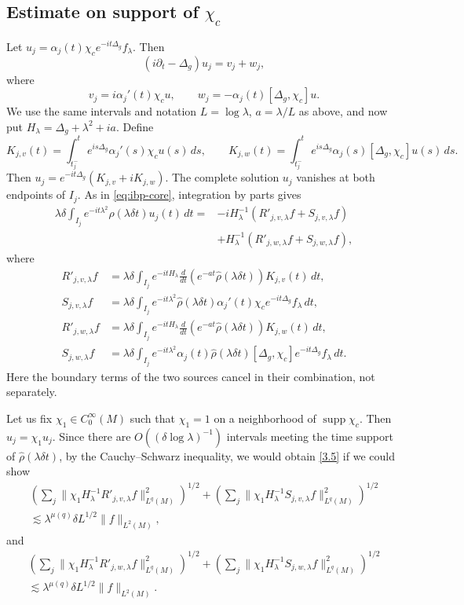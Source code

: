 \documentclass[11pt]{amsart}
\newcommand{\la}{\lambda}
\begin{document}
\subsection{Estimate on support of $\chi_c$}
Let $u_j=\alpha_j(t)\chi_ce^{-it\Delta_g}f_\la$. Then
\[
(i\partial_t-\Delta_g)u_j=v_j+w_j,
\]
where
\begin{equation}\label{eq:def-ujvj}
v_j=i\alpha_j'(t)\chi_cu,\qquad
w_j=-\alpha_j(t)[\Delta_g,\chi_c]u.
\end{equation}
We use the same intervals and notation $L=\log\la$, $a=\la/L$ as above, and now put $H_\la=\Delta_g+\la^2+ia$. Define
\[
K_{j,v}(t)=\int_{t_j^-}^t e^{is\Delta_g}\alpha_j'(s)\chi_cu(s)\,ds,
\qquad
K_{j,w}(t)=\int_{t_j^-}^t e^{is\Delta_g}\alpha_j(s)[\Delta_g,\chi_c]u(s)\,ds.
\]
Then $u_j=e^{-it\Delta_g}(K_{j,v}+iK_{j,w})$. The complete solution $u_j$ vanishes at both endpoints of $I_j$. As in \eqref{eq:ibp-core}, integration by parts gives
\begin{equation}\label{eq:ibp-exterior}
\begin{split}
\la\delta\int_{I_j}e^{-it\la^2}\widehat\rho(\la\delta t)u_j(t)\,dt
={}&-iH_\la^{-1}(R'_{j,v,\la}f+S_{j,v,\la}f)\\
&+H_\la^{-1}(R'_{j,w,\la}f+S_{j,w,\la}f),
\end{split}
\end{equation}
where
\begin{align*}
R'_{j,v,\la}f&=\la\delta\int_{I_j}e^{-itH_\la}
\frac{d}{dt}(e^{-at}\widehat\rho(\la\delta t))K_{j,v}(t)\,dt,\\
S_{j,v,\la}f&=\la\delta\int_{I_j}e^{-it\la^2}\widehat\rho(\la\delta t)
\alpha_j'(t)\chi_ce^{-it\Delta_g}f_\la\,dt,\\
R'_{j,w,\la}f&=\la\delta\int_{I_j}e^{-itH_\la}
\frac{d}{dt}(e^{-at}\widehat\rho(\la\delta t))K_{j,w}(t)\,dt,\\
S_{j,w,\la}f&=\la\delta\int_{I_j}e^{-it\la^2}\alpha_j(t)\widehat\rho(\la\delta t)
[\Delta_g,\chi_c]e^{-it\Delta_g}f_\la\,dt.
\end{align*}
Here the boundary terms of the two sources cancel in their combination, not separately.

Let us fix $\chi_1\in C_0^\infty(M)$ such that $\chi_1=1$ on a neighborhood of $\operatorname{supp}\chi_c$. Then $u_j=\chi_1u_j$. Since there are $O((\delta\log\la)^{-1})$ intervals meeting the time support of $\widehat\rho(\la\delta t)$, by the Cauchy--Schwarz inequality, we would obtain \eqref{3.5} if we could show
\begin{multline}\label{3.13}
\left(\sum_j\|\chi_1H_\la^{-1}R'_{j,v,\la}f\|_{L^q(M)}^2\right)^{1/2}
+\left(\sum_j\|\chi_1H_\la^{-1}S_{j,v,\la}f\|_{L^q(M)}^2\right)^{1/2}\\
\lesssim\la^{\mu(q)}\delta L^{1/2}\|f\|_{L^2(M)},
\end{multline}
and
\begin{multline}\label{3.14}
\left(\sum_j\|\chi_1H_\la^{-1}R'_{j,w,\la}f\|_{L^q(M)}^2\right)^{1/2}
+\left(\sum_j\|\chi_1H_\la^{-1}S_{j,w,\la}f\|_{L^q(M)}^2\right)^{1/2}\\
\lesssim\la^{\mu(q)}\delta L^{1/2}\|f\|_{L^2(M)}.
\end{multline}
\end{document}
